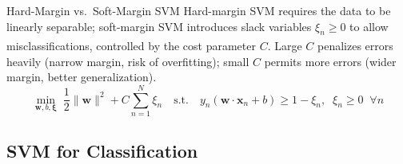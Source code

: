 \begin{v3topic}{Hard-Margin vs.\ Soft-Margin SVM}
    Hard-margin SVM requires the data to be linearly separable; soft-margin SVM introduces slack variables $\xi_n \geq 0$ to allow misclassifications, controlled by the cost parameter $C$\textsuperscript{\cite[][pp.~98--101]{iiiCourseMachineLearning}}. Large $C$ penalizes errors heavily (narrow margin, risk of overfitting); small $C$ permits more errors (wider margin, better generalization).
\visualseparator
    \begin{equation}
        \min_{\mathbf{w},b,\boldsymbol{\xi}}\; \frac{1}{2}\|\mathbf{w}\|^2 + C\sum_{n=1}^{N}\xi_n
        \quad\text{s.t.}\quad
        y_n(\mathbf{w}\cdot\mathbf{x}_n + b) \geq 1 - \xi_n,\;\; \xi_n \geq 0 \;\;\forall n
    \end{equation}
\end{v3topic}

\subsection{SVM for Classification}

